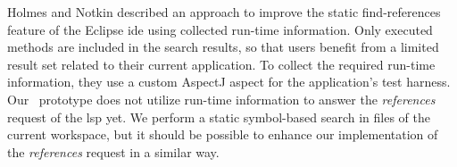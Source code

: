 \documentclass[sigplan,10pt,review,anonymous]{acmart}
\begin{document}

Holmes and Notkin \cite{holmes2010enhancing} described an approach to improve
the static find-references feature of the Eclipse \ac{ide} using collected
run-time information. Only executed methods are included in the search results,
so that users benefit from a limited result set related to their current
application. To collect the required run-time information, they use a custom
AspectJ \cite{kiczales2001overview} aspect for the application's test
harness. %
Our \graallsp~prototype does not utilize run-time information to answer the
\emph{references} request of the \ac{lsp} yet. We perform a static symbol-based
search in files of the current workspace, but it should be possible to enhance
our implementation of the \emph{references} request in a similar way.
\end{document}
